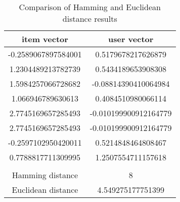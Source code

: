 \begin{table}

    \center

    \begin{tabular}{ c | c }
        \rowcolor{\dustRowHead}
        item vector         & user vector\\\hline
        -0.2589067897584001 & 0.5179678217626879\\
        1.2304489213782739  & 0.5434189653908308\\
        1.5984257066728682  & -0.08814390410064984\\
        1.066946789630613   & 0.4084510980066114\\
        2.7745169657285493  & -0.010199900912164779\\
        2.7745169657285493  & -0.010199900912164779\\
        -0.2597102950420011 & 0.5214848464808467\\
        0.7788817711309995  & 1.2507554711157618\\
        \hline
        \rowcolor{\dustRowHead}
        \multicolumn{2}{ c }{resulting distance}\\
        \hline
        Hamming distance    & 8\\
        Euclidean distance  & 4.549275177751399\\
    \end{tabular}

    \caption{Comparison of Hamming and Euclidean distance results}
    \label{tab:hamming-vs-euclidean}
\end{table}



